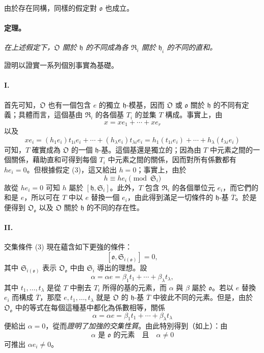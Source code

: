 \documentclass[11pt]{article}
\begin{document}
由於存在同構，同樣的假定對 $\mathfrak o$ 也成立。

\paragraph{定理。}
\emph{在上述假定下，$\mathfrak O$ 關於 $\mathfrak h$ 的不同成為各 $\mathfrak R_i$ 關於 $\mathfrak h_i$ 的不同的直和。}

證明以證實一系列個別事實為基礎。

\paragraph{I.}
首先可知，$\mathfrak O$ 也有一個包含 $e$ 的獨立 $\mathfrak h$-模基，因而 $\mathfrak O$ 或 $\mathfrak o$ 關於 $\mathfrak h$ 的不同有定義；具體而言，這個基由 $\mathfrak R_i$ 的各個基 $T_i$ 的並集 $T$ 構成。事實上，由
\[
x=xe_1+\cdots+xe_r
\]
以及
\[
xe_i=(h_1e_i)t_{1i}e_i+\cdots+(h_\lambda e_i)t_{\lambda i}e_i
=h_1(t_{1i}e_i)+\cdots+h_\lambda(t_{\lambda i}e_i)
\]
可知，$T$ 確實成為 $\mathfrak O$ 的一個 $\mathfrak h$-基。這個基還是獨立的；因為由 $T$ 中元素之間的一個關係，藉助直和可得到每個 $T_i$ 中元素之間的關係，因而對所有係數都有 $h e_i=0$。但根據假定 (3)，這又給出 $h=0$；事實上，由於
\[
h\equiv h e_i\pmod{\mathfrak S_i}
\]
故從 $h e_i=0$ 可知 $h$ 屬於 $[\mathfrak h,\mathfrak S_i]$。此外，$T$ 包含 $\mathfrak R_i$ 的各個單位元 $e_i$，而它們的和是 $e$，所以可在 $T$ 中以 $e$ 替換一個 $e_i$，由此得到滿足一切條件的 $\mathfrak h$-基 $\overline T$。於是便得到 $\mathfrak O_{\mathfrak o}$ 以及 $\mathfrak O$ 關於 $\mathfrak h$ 的不同的存在性。

\paragraph{II.}
交集條件 (3) 現在蘊含如下更強的條件：
\[
[\mathfrak o,\mathfrak S_{i(\mathfrak o)}]=0,
\]
其中 $\mathfrak S_{i(\mathfrak o)}$ 表示 $\mathfrak O_{\mathfrak o}$ 中由 $\mathfrak S_i$ 導出的理想。設
\[
\alpha=\alpha e=\beta_1t_1+\cdots+\beta_\lambda t_\lambda,
\]
其中 $t_1,\ldots,t_\lambda$ 是從 $T$ 中刪去 $T_i$ 所得的基的元素，而 $\alpha$ 與 $\beta$ 屬於 $\mathfrak o$。若以 $e$ 替換 $e_i$ 而構成 $\overline T$，那麼 $e,t_1,\ldots,t_\lambda$ 就是 $\mathfrak O$ 的 $\mathfrak h$-基 $\overline T$ 中彼此不同的元素。但是，由於 $\mathfrak O_{\mathfrak o}$ 中的等式在每個這種基中都化為係數相等，關係
\[
\alpha=\alpha e=\beta_1t_1+\cdots+\beta_\lambda t_\lambda
\]
便給出 $\alpha=0$，從而\emph{證明了加強的交集性質}。由此特別得到（如上）：由
\[
\alpha\text{ 是 }\mathfrak o\text{ 的元素}\quad\text{且}\quad\alpha\ne0
\]
可推出 $\alpha e_i\ne0$。
\end{document}
